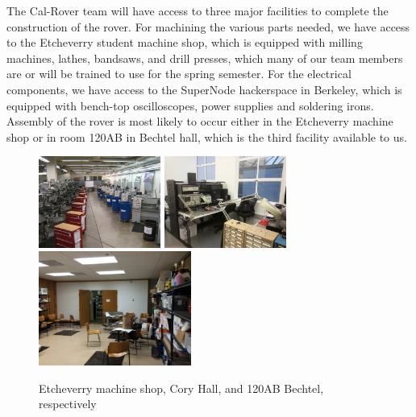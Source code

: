 \documentclass[titlepage,twocolumn,10pt]{article}
\begin{document}
    The Cal-Rover team will have access to three major facilities to complete the construction of the rover. For machining the various parts needed, we have access to the Etcheverry student machine shop, which is equipped with milling machines, lathes, bandsaws, and drill presses, which many of our team members are or will be trained to use for the spring semester. For the electrical components, we have access to the SuperNode hackerspace in Berkeley, which is equipped with bench-top oscilloscopes, power supplies and soldering irons. Assembly of the rover is most likely to occur either in the Etcheverry machine shop or in room 120AB in Bechtel hall, which is the third facility available to us.

    \begin{figure}[H]
        \centering
        \includegraphics*[width = 4cm]{images/etch.jpg}
        \includegraphics*[width = 4cm]{images/cory.jpg}
        \includegraphics*[width = 5cm]{images/becht.jpg}
        \caption{Etcheverry machine shop, Cory Hall, and 120AB Bechtel, respectively}
    \end{figure}
\end{document}
